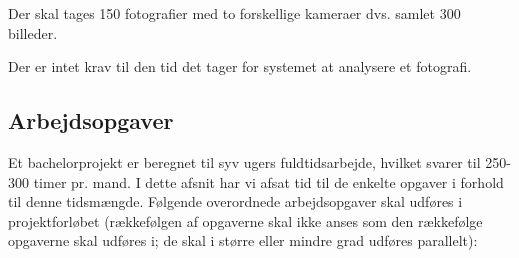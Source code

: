 \documentclass[10pt,a4paper,final]{report}
\begin{document}
Der skal tages 150 fotografier med to forskellige kameraer dvs. samlet 300 billeder. 

Der er intet krav til den tid det tager for systemet at analysere et fotografi.












	
\subsection*{Arbejdsopgaver}
Et bachelorprojekt er beregnet til syv ugers fuldtidsarbejde, hvilket svarer til 250-300 timer pr. mand. I dette afsnit har vi afsat tid til de enkelte opgaver i forhold til denne tidsmængde. Følgende overordnede arbejdsopgaver skal udføres i projektforløbet (rækkefølgen af opgaverne skal ikke anses som den rækkefølge opgaverne skal udføres i; de skal i større eller mindre grad udføres parallelt):
\end{document}
